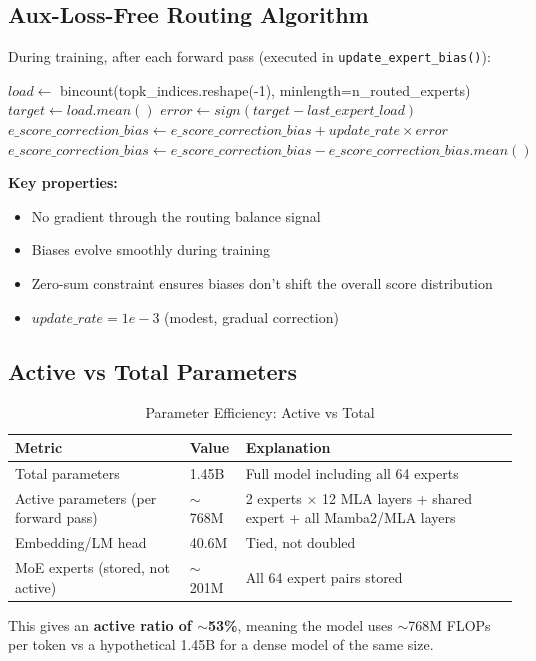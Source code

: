 \subsection{Aux-Loss-Free Routing Algorithm}

During training, after each forward pass (executed in \texttt{update\_expert\_bias()}):

\begin{algorithm}[H]
\caption{Aux-Loss-Free Routing Bias Update}
\begin{algorithmic}
\STATE $load \leftarrow$ bincount(topk\_indices.reshape(-1), minlength=n\_routed\_experts)
\STATE $target \leftarrow load.mean()$
\STATE $error \leftarrow sign(target - last\_expert\_load)$
\STATE $e\_score\_correction\_bias \leftarrow e\_score\_correction\_bias + update\_rate \times error$
\STATE $e\_score\_correction\_bias \leftarrow e\_score\_correction\_bias - e\_score\_correction\_bias.mean()$ 
\end{algorithmic}
\end{algorithm}

\textbf{Key properties:}
\begin{itemize}
    \item No gradient through the routing balance signal
    \item Biases evolve smoothly during training
    \item Zero-sum constraint ensures biases don't shift the overall score distribution
    \item $update\_rate = 1e-3$ (modest, gradual correction)
\end{itemize}

\subsection{Active vs Total Parameters}

\begin{table}[ht!]
    \centering
    \caption{Parameter Efficiency: Active vs Total}
    \begin{tabular}{lll}
        \toprule
        \textbf{Metric} & \textbf{Value} & \textbf{Explanation} \\
        \midrule
        Total parameters & 1.45B & Full model including all 64 experts \\
        Active parameters (per forward pass) & $\sim$768M & 2 experts $\times$ 12 MLA layers + shared expert + all Mamba2/MLA layers \\
        Embedding/LM head & 40.6M & Tied, not doubled \\
        MoE experts (stored, not active) & $\sim$201M & All 64 expert pairs stored \\
        \bottomrule
    \end{tabular}
\end{table}

This gives an \textbf{active ratio of $\sim$53\%}, meaning the model uses $\sim$768M FLOPs per token vs a hypothetical 1.45B for a dense model of the same size.
